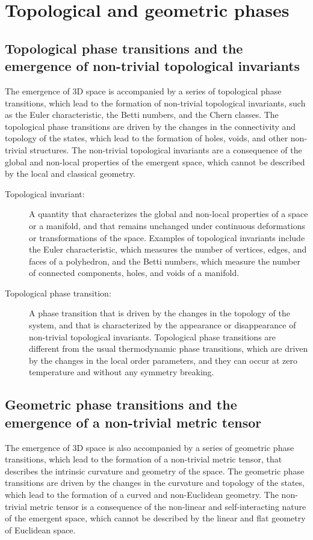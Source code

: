 \section{Topological and geometric phases}
\subsection{Topological phase transitions and the emergence of non-trivial topological invariants}
The emergence of 3D space is accompanied by a series of topological phase transitions, which lead to the formation of non-trivial topological invariants, such as the Euler characteristic, the Betti numbers, and the Chern classes. The topological phase transitions are driven by the changes in the connectivity and topology of the states, which lead to the formation of holes, voids, and other non-trivial structures. The non-trivial topological invariants are a consequence of the global and non-local properties of the emergent space, which cannot be described by the local and classical geometry.

\begin{tcolorbox}[colback=blue!5!white,colframe=blue!75!black,title=New terms]
\begin{description}
\item[Topological invariant:] A quantity that characterizes the global and non-local properties of a space or a manifold, and that remains unchanged under continuous deformations or transformations of the space. Examples of topological invariants include the Euler characteristic, which measures the number of vertices, edges, and faces of a polyhedron, and the Betti numbers, which measure the number of connected components, holes, and voids of a manifold.
\item[Topological phase transition:] A phase transition that is driven by the changes in the topology of the system, and that is characterized by the appearance or disappearance of non-trivial topological invariants. Topological phase transitions are different from the usual thermodynamic phase transitions, which are driven by the changes in the local order parameters, and they can occur at zero temperature and without any symmetry breaking.
\end{description}
\end{tcolorbox}

\subsection{Geometric phase transitions and the emergence of a non-trivial metric tensor}
The emergence of 3D space is also accompanied by a series of geometric phase transitions, which lead to the formation of a non-trivial metric tensor, that describes the intrinsic curvature and geometry of the space. The geometric phase transitions are driven by the changes in the curvature and topology of the states, which lead to the formation of a curved and non-Euclidean geometry. The non-trivial metric tensor is a consequence of the non-linear and self-interacting nature of the emergent space, which cannot be described by the linear and flat geometry of Euclidean space.

